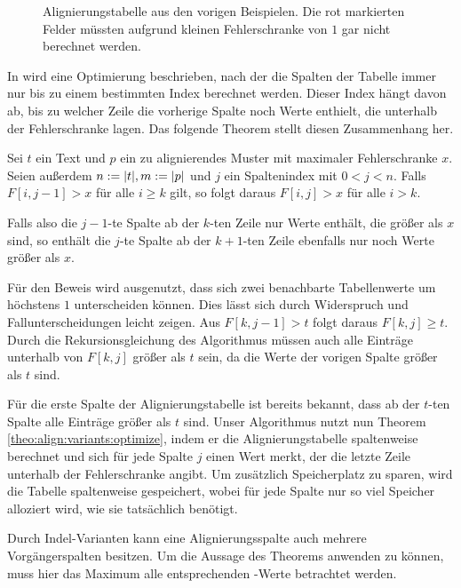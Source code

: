 \begin{figure}[htbp]
\caption{Alignierungstabelle aus den vorigen Beispielen. Die rot markierten Felder müssten aufgrund kleinen Fehlerschranke von $1$ gar nicht berechnet werden.}
\label{fig:align:basics:errors}
\end{figure}

In \citep{Rahmann2013} wird eine Optimierung beschrieben, nach der die Spalten der Tabelle immer nur bis zu einem bestimmten Index berechnet werden. Dieser Index hängt davon ab, bis zu welcher Zeile die vorherige Spalte noch Werte enthielt, die unterhalb der Fehlerschranke lagen. Das folgende Theorem stellt diesen Zusammenhang her.

\begin{theorem}
\label{theo:align:variants:optimize}
Sei $t$ ein Text und $p$ ein zu alignierendes Muster mit maximaler Fehlerschranke $x$. Seien außerdem $n := \lvert t \rvert, m := \lvert p \rvert$ und $j$ ein Spaltenindex mit $0 < j < n$. Falls $F[i,j-1] > x$ für alle $i \geq k$ gilt, so folgt daraus $F[i,j] > x$ für alle $i > k$.

Falls also die $j-1$-te Spalte ab der $k$-ten Zeile nur Werte enthält, die größer als $x$ sind, so enthält die $j$-te Spalte ab der $k+1$-ten Zeile ebenfalls nur noch Werte größer als $x$.
\end{theorem}

\begin{beweis}
Für den Beweis wird ausgenutzt, dass sich zwei benachbarte Tabellenwerte um höchstens $1$ unterscheiden können. Dies lässt sich durch Widerspruch und Fallunterscheidungen leicht zeigen. Aus $F[k,j-1] > t$ folgt daraus $F[k,j] \geq t$. Durch die Rekursionsgleichung des Algorithmus müssen auch alle Einträge unterhalb von $F[k,j]$ größer als $t$ sein, da die Werte der vorigen Spalte größer als $t$ sind.
\end{beweis}

Für die erste Spalte der Alignierungstabelle ist bereits bekannt, dass ab der $t$-ten Spalte alle Einträge größer als $t$ sind. Unser Algorithmus nutzt nun Theorem \ref{theo:align:variants:optimize}, indem er die Alignierungstabelle spaltenweise berechnet und sich für jede Spalte $j$ einen Wert  merkt, der die letzte Zeile unterhalb der Fehlerschranke angibt. Um zusätzlich Speicherplatz zu sparen, wird die Tabelle spaltenweise gespeichert, wobei für jede Spalte nur so viel Speicher alloziert wird, wie sie tatsächlich benötigt.

Durch Indel-Varianten kann eine Alignierungsspalte auch mehrere Vorgängerspalten besitzen. Um die Aussage des Theorems anwenden zu können, muss hier das Maximum alle entsprechenden -Werte betrachtet werden.